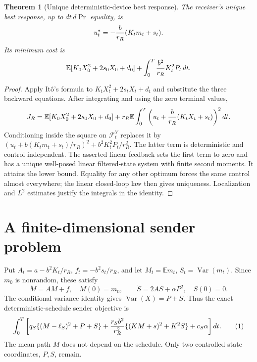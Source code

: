 \documentclass[11pt]{article}
\newtheorem{theorem}{Theorem}
\theoremstyle{definition}
\begin{document}
\begin{theorem}[Unique deterministic-device best response]
The receiver's unique best response, up to $dt\,d\Pr$ equality, is
\[
 u_t^*=-{b\over r_R}(K_tm_t+s_t).
\]
Its minimum cost is
\[
 \mathbb E[K_0X_0^2+2s_0X_0+d_0]
       +\int_0^T{b^2\over r_R}K_t^2P_t\,dt.
\]
\end{theorem}
\begin{proof}
Apply It\^o's formula to $K_tX_t^2+2s_tX_t+d_t$ and substitute the three
backward equations. After integrating and using the zero terminal values,
\[
 J_R=\mathbb E[K_0X_0^2+2s_0X_0+d_0]
       +r_R\mathbb E\int_0^T
          \left(u_t+{b\over r_R}(K_tX_t+s_t)\right)^2dt.
\]
Conditioning inside the square on $\mathcal F_t^Y$ replaces it by
$(u_t+b(K_tm_t+s_t)/r_R)^2+b^2K_t^2P_t/r_R^2$.
The latter term is deterministic and control independent. The asserted
linear feedback sets the first term to zero and has a unique well-posed
linear filtered-state system with finite second moments. It attains the
lower bound. Equality for any other optimum forces the same control
almost everywhere; the linear closed-loop law then gives uniqueness.
Localization and $L^2$ estimates justify the integrals in the identity.
\end{proof}

\section*{A finite-dimensional sender problem}
Put $A_t=a-b^2K_t/r_R$, $f_t=-b^2s_t/r_R$, and let
$M_t=\mathbb E m_t$, $S_t=\operatorname{Var}(m_t)$. Since $m_0$ is
nonrandom, these satisfy
\[
 \dot M=AM+f,\quad M(0)=m_0,\qquad
 \dot S=2AS+\alpha P^2,\quad S(0)=0.
\]
The conditional variance identity gives $\operatorname{Var}(X)=P+S$.
Thus the exact deterministic-schedule sender objective is
\[
 \int_0^T\left[q_S\{(M-\ell_S)^2+P+S\}
 +{r_Sb^2\over r_R^2}\{(KM+s)^2+K^2S\}+c_S\alpha\right]dt. \tag{1}
\]
The mean path $M$ does not depend on the schedule. Only two controlled
state coordinates, $P,S$, remain.
\end{document}
